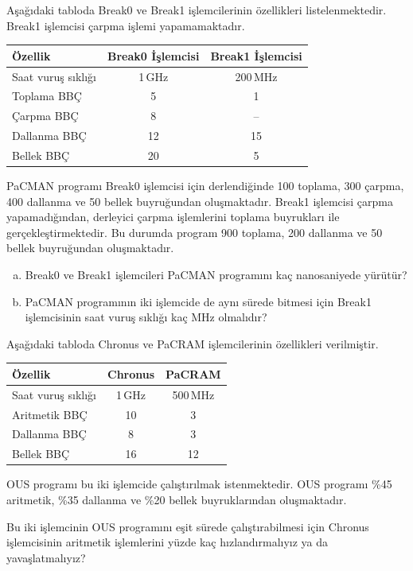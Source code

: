 \begin{alistirma}[\zor]
Aşağıdaki tabloda Break0 ve Break1 işlemcilerinin özellikleri listelenmektedir. Break1 işlemcisi çarpma işlemi yapamamaktadır.

\begin{center}
\begin{tabular}{lcc}
\toprule
\textbf{Özellik} & \textbf{Break0 İşlemcisi} & \textbf{Break1 İşlemcisi} \\
\midrule
Saat vuruş sıklığı & 1\,GHz & 200\,MHz \\
Toplama BBÇ & 5 & 1 \\
Çarpma BBÇ & 8 & -- \\
Dallanma BBÇ & 12 & 15 \\
Bellek BBÇ & 20 & 5 \\
\bottomrule
\end{tabular}
\end{center}

PaCMAN programı Break0 işlemcisi için derlendiğinde 100 toplama, 300 çarpma, 400 dallanma ve 50 bellek buyruğundan oluşmaktadır. Break1 işlemcisi çarpma yapamadığından, derleyici çarpma işlemlerini toplama buyrukları ile gerçekleştirmektedir. Bu durumda program 900 toplama, 200 dallanma ve 50 bellek buyruğundan oluşmaktadır.

\begin{enumerate}[(a)]
    \item Break0 ve Break1 işlemcileri PaCMAN programını kaç nanosaniyede yürütür?
    \item PaCMAN programının iki işlemcide de aynı sürede bitmesi için Break1 işlemcisinin saat vuruş sıklığı kaç MHz olmalıdır?
\end{enumerate}
\end{alistirma}


\begin{alistirma}[\orta]
Aşağıdaki tabloda Chronus ve PaCRAM işlemcilerinin özellikleri verilmiştir.

\begin{center}
\begin{tabular}{lcc}
\toprule
\textbf{Özellik} & \textbf{Chronus} & \textbf{PaCRAM} \\
\midrule
Saat vuruş sıklığı & 1\,GHz & 500\,MHz \\
Aritmetik BBÇ & 10 & 3 \\
Dallanma BBÇ & 8 & 3 \\
Bellek BBÇ & 16 & 12 \\
\bottomrule
\end{tabular}
\end{center}

OUS programı bu iki işlemcide çalıştırılmak istenmektedir. OUS programı \%45 aritmetik, \%35 dallanma ve \%20 bellek buyruklarından oluşmaktadır.

Bu iki işlemcinin OUS programını eşit sürede çalıştırabilmesi için Chronus işlemcisinin aritmetik işlemlerini yüzde kaç hızlandırmalıyız ya da yavaşlatmalıyız?
\end{alistirma}

